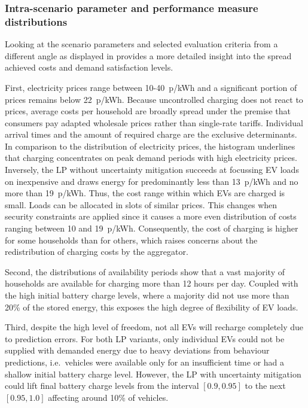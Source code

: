 \subsubsection*{Intra-scenario parameter and performance measure distributions}

Looking at the scenario parameters and selected evaluation criteria from a different angle as displayed in  provides a more detailed insight into the spread achieved costs and demand satisfaction levels.

First, electricity prices range between \mbox{10-40 p/kWh} and a significant portion of prices remains below \mbox{22 p/kWh}. Because uncontrolled charging does not react to prices, average costs per household are broadly spread under the premise that consumers pay adapted wholesale prices rather than single-rate tariffs. Individual arrival times and the amount of required charge are the exclusive determinants. In comparison to the distribution of electricity prices, the histogram underlines that charging concentrates on peak demand periods with high electricity prices. Inversely, the LP without uncertainty mitigation succeeds at focussing EV loads on inexpensive and draws energy for predominantly less than \mbox{13 p/kWh} and no more than \mbox{19 p/kWh}. Thus, the cost range within which EVs are charged is small. Loads can be allocated in slots of similar prices. This changes when security constraints are applied since it causes a more even distribution of costs ranging between 10 and \mbox{19 p/kWh}. Consequently, the cost of charging is higher for some households than for others, which raises concerns about the redistribution of charging costs by the aggregator.

Second, the distributions of availability periods show that a vast majority of households are available for charging more than 12 hours per day. Coupled with the high initial battery charge levels, where a majority did not use more than 20\% of the stored energy, this exposes the high degree of flexibility of EV loads.

Third, despite the high level of freedom, not all EVs will recharge completely due to prediction errors. For both LP variants, only individual EVs could not be supplied with demanded energy due to heavy deviations from behaviour predictions, i.e.\ vehicles were available only for an insufficient time or had a shallow initial battery charge level. However, the LP with uncertainty mitigation could lift final battery charge levels from the interval $[0.9,0.95]$ to the next $[0.95,1.0]$ affecting around 10\% of vehicles.

